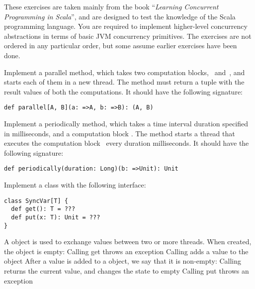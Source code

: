 \documentclass[11pt]{article}
\begin{document}
\myHeader

These exercises are taken mainly from the book ``\emph{Learning Concurrent Programming in Scala}'', and are designed to test the knowledge of the Scala programming language. 
%
You are required to implement higher-level concurrency abstractions in terms of basic JVM concurrency primitives.
The exercises are not ordered in any particular order, but some assume earlier exercises have been done.



\begin{myExercise}Implement a parallel method, which takes two computation blocks,~ and~, and starts each of them in a new thread. The method must return a tuple with the result values of both the computations. It should have the following signature:
\begin{lstlisting}
def parallel[A, B](a: =>A, b: =>B): (A, B)
\end{lstlisting}
\end{myExercise}

\begin{myExercise}Implement a periodically method, which takes a time interval duration specified in milliseconds, and a computation block . The method starts a thread that executes the computation block~ every duration milliseconds. It should have the following signature:
\begin{lstlisting}
def periodically(duration: Long)(b: =>Unit): Unit
\end{lstlisting}
\end{myExercise}

\begin{myExercise}Implement a  class with the following interface:
\begin{lstlisting}
class SyncVar[T] {
  def get(): T = ???
  def put(x: T): Unit = ???
}
\end{lstlisting}
A  object is used to exchange values between two or more threads.
When created, the  object is empty: Calling get throws an exception
Calling  adds a value to the  object
After a value is added to a  object, we say that it is non-empty:
Calling  returns the current value, and changes the state to empty Calling put throws an exception

\end{myExercise}
\end{document}
